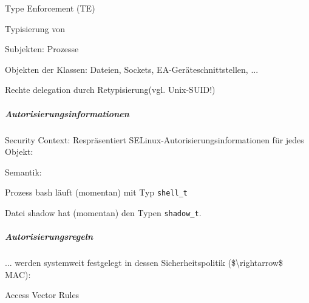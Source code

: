 \documentclass[a4paper]{article}
\begin{document}
\begin{multicols}{3}
    \begin{itemize*}
        \item
        Type Enforcement (TE)
        \item
        Typisierung von
        \begin{itemize*}
            \item Subjekten: Prozesse
            \item Objekten der Klassen: Dateien, Sockets, EA-Geräteschnittstellen, ...
        \end{itemize*}
        \item
        Rechte delegation durch Retypisierung(vgl. Unix-SUID!)
        \item
    \end{itemize*}


    \subparagraph{Autorisierungsinformationen}

    Security Context: Respräsentiert SELinux-Autorisierungsinformationen für
    jedes Objekt:


    \begin{itemize*}
        \item
        Semantik:
        \begin{itemize*}
            \item Prozess bash läuft (momentan) mit Typ \texttt{shell\_t}
            \item Datei shadow hat (momentan) den Typen \texttt{shadow\_t}.
        \end{itemize*}
    \end{itemize*}


    \subparagraph{Autorisierungsregeln}

    ... werden systemweit festgelegt in dessen Sicherheitspolitik
    (\$\textbackslash rightarrow\$ MAC):

    Access Vector Rules


\end{multicols}
\end{document}
